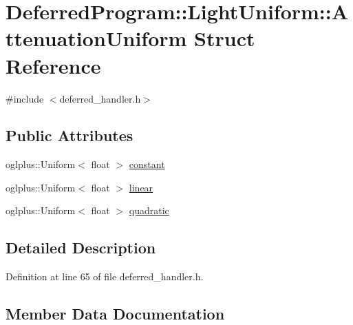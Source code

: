 \hypertarget{struct_deferred_program_1_1_light_uniform_1_1_attenuation_uniform}{}\section{Deferred\+Program\+:\+:Light\+Uniform\+:\+:Attenuation\+Uniform Struct Reference}
\label{struct_deferred_program_1_1_light_uniform_1_1_attenuation_uniform}


{\ttfamily \#include $<$deferred\+\_\+handler.\+h$>$}

\subsection*{Public Attributes}
\begin{DoxyCompactItemize}
\item 
oglplus\+::\+Uniform$<$ float $>$ \hyperlink{struct_deferred_program_1_1_light_uniform_1_1_attenuation_uniform_a1ba6809e503adc15b73b992f88c0dd24}{constant}
\item 
oglplus\+::\+Uniform$<$ float $>$ \hyperlink{struct_deferred_program_1_1_light_uniform_1_1_attenuation_uniform_ac93e1950d2f61345cb2c4ae1dea0f991}{linear}
\item 
oglplus\+::\+Uniform$<$ float $>$ \hyperlink{struct_deferred_program_1_1_light_uniform_1_1_attenuation_uniform_a7ab81a4f6fc4e6c8c9a4f842f666fa2d}{quadratic}
\end{DoxyCompactItemize}


\subsection{Detailed Description}


Definition at line 65 of file deferred\+\_\+handler.\+h.



\subsection{Member Data Documentation}
\hypertarget{struct_deferred_program_1_1_light_uniform_1_1_attenuation_uniform_a1ba6809e503adc15b73b992f88c0dd24}{}
